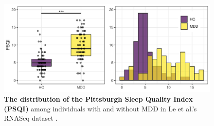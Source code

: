 \documentclass{article}
\begin{document}

\begin{figure}[h]%
\centerline{\includegraphics[]{../figs/psqi_plots.pdf}}
\caption{\textbf{The distribution of the Pittsburgh Sleep Quality Index (PSQI)} among individuals with and without MDD in Le et al.'s RNASeq dataset \cite{le18}.}
\label{fig:psqi_plots}
\end{figure}
\end{document}
